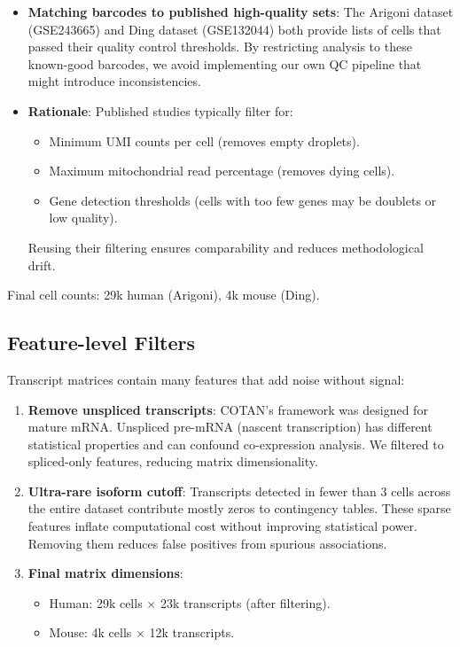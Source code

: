 \begin{itemize}
    \item \textbf{Matching barcodes to published high-quality sets}: The Arigoni dataset (GSE243665) and Ding dataset (GSE132044) both provide lists of cells that passed their quality control thresholds. By restricting analysis to these known-good barcodes, we avoid implementing our own QC pipeline that might introduce inconsistencies.
    \item \textbf{Rationale}: Published studies typically filter for:
    \begin{itemize}
        \item Minimum UMI counts per cell (removes empty droplets).
        \item Maximum mitochondrial read percentage (removes dying cells).
        \item Gene detection thresholds (cells with too few genes may be doublets or low quality).
    \end{itemize}
    Reusing their filtering ensures comparability and reduces methodological drift.
\end{itemize}

Final cell counts: 29k human (Arigoni), 4k mouse (Ding).

\subsection*{Feature-level Filters}

Transcript matrices contain many features that add noise without signal:

\begin{enumerate}
    \item \textbf{Remove unspliced transcripts}: COTAN's framework was designed for mature mRNA. Unspliced pre-mRNA (nascent transcription) has different statistical properties and can confound co-expression analysis. We filtered to spliced-only features, reducing matrix dimensionality.
    \item \textbf{Ultra-rare isoform cutoff}: Transcripts detected in fewer than 3 cells across the entire dataset contribute mostly zeros to contingency tables. These sparse features inflate computational cost without improving statistical power. Removing them reduces false positives from spurious associations.
    \item \textbf{Final matrix dimensions}:
    \begin{itemize}
        \item Human: 29k cells $\times$ 23k transcripts (after filtering).
        \item Mouse: 4k cells $\times$ 12k transcripts.
    \end{itemize}
\end{enumerate}


